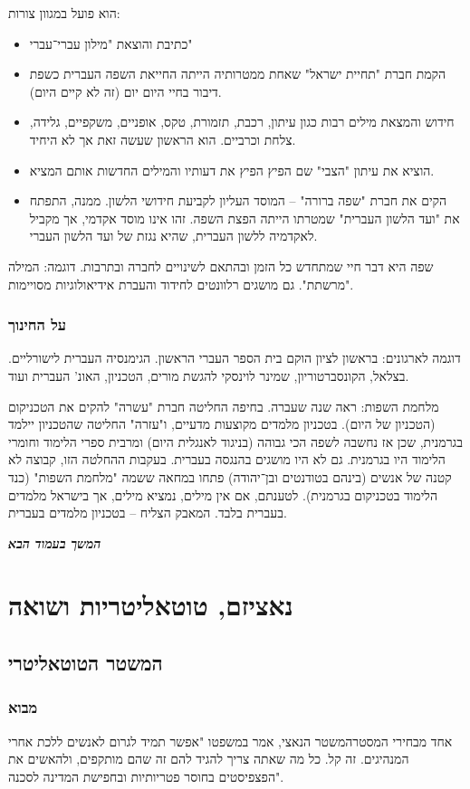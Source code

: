 \documentclass[a4paper]{book}
\newcommand\npchapter[1] {\npage\chapter{#1}\thispagestyle{empty}\newpage}
\newcommand\npage {\vfil {\hfil \textbf{\textit{המשך בעמוד הבא}}} \hfil \vfil \pagebreak}
\begin{document}
	הוא פועל במגוון צורות: 
	\begin{itemize}
		\item כתיבת והוצאת "מילון עברי־עברי"
		\item הקמת חברת "תחיית ישראל" שאחת ממטרותיה הייתה החייאת השפה העברית כשפת דיבור בחיי היום יום (זה לא קיים היום). 
		\item חידוש והמצאת מילים רבות כגון עיתון, רכבת, תזמורת, טקס, אופניים, משקפיים, גלידה, צלחת וכרביים. הוא הראשון שעשה זאת אך לא היחיד. 
		\item הוציא את עיתון "הצבי" שם הפיץ הפיץ את דעותיו והמילים החדשות אותם המציא. 
		\item הקים את חברת "שפה ברורה" – המוסד העליון לקביעת חידושי הלשון. ממנה, התפתח את "ועד הלשון העברית" שמטרתו הייתה הפצת השפה. זהו אינו מוסד אקדמי, אך מקביל לאקדמיה ללשון העברית, שהיא נגזת של ועד הלשון העברי. 
	\end{itemize}
	
	שפה היא דבר חיי שמתחדש כל הזמן ובהתאם לשינויים לחברה ובתרבות. דוגמה: המילה "מרשתת". גם מושגים רלוונטים לחידוד והעברת אידיאולוגיות מסויימות. 
	
	\subsection{על החינוך}
	דוגמה לארגונים: בראשון לציון הוקם בית הספר העברי הראשון. הגימנסיה העברית לישורליים. בצלאל, הקונסברטוריון, שמינר לוינסקי להגשת מורים, הטכניון, האונ' העברית ועוד. 
	
	מלחמת השפות: ראה שנה שעברה. בחיפה החליטה חברת "עשרה" להקים את הטכניקום (הטכניון של היום). בטכניון מלמדים מקוצעות מדעיים, ו"עזרה" החליטה שהטכניון יילמד בגרמנית, שכן אז נחשבה לשפה הכי גבוהה (בניגוד לאנגלית היום) ומרבית ספרי הלימוד וחומרי הלימוד היו בגרמנית. גם לא היו מושגים בהנגסה בעברית. בעקבות ההחלטה הזו, קבוצה לא קטנה של אנשים (בינהם בטודנטים ובן־יהודה) פתחו במחאה ששמה "מלחמת השפות" (כנד הלימוד בטכניקום בגרמנית). לטענתם, אם אין מילים, נמציא מילים, אך בישראל מלמדים בעברית בלבד. המאבק הצליח – בטכניון מלמדים בעברית. 
	
	
	\npchapter{נאציזם, טוטאליטריות ושואה}
	
	\section{המשטר הטוטאליטרי}
	\subsection{מבוא}
	אחד מבחירי המסטרהמשטר הנאצי, אמר במשפטו "אפשר תמיד לגרום לאנשים ללכת אחרי המנהיגים. זה קל. כל מה שאתה צריך להגיד להם זה שהם מותקפים, ולהאשים את הפצפיסטים בחוסר פטריותיות ובחפישת המדינה לסכנה". 
	
\end{document}

